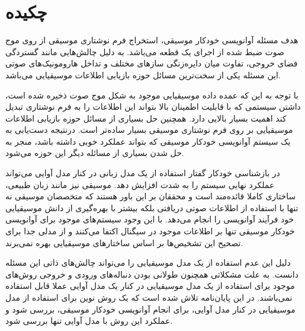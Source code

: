 \chapter*{چکیده}
هدف مسئله آوانویسی خودکار موسیقی، استخراج فرم نوشتاری موسیقی از روی موج صوت ضبط
شده از اجرای یک قطعه می‌باشد. به دلیل چالش‌هایی مانند گستردگی فضای خروجی، تفاوت
میان دایره‌زنگی سازهای مختلف و تداخل هارومونیک‌های صوتی این مسئله یکی از
سخت‌ترین مسائل حوزه بازیابی اطلاعات موسیقیایی می‌باشد.

با توجه به این که عمده داده موسیقیایی موجود به شکل موج صوت ذخیره شده است، داشتن
سیستمی که با قابلیت اطمینان بالا بتواند این اطلاعات را به فرم نوشتاری تبدیل کند
اهمیت بسیار بالایی دارد. همچنین حل بسیاری از مسائل حوزه بازیابی اطلاعات
موسیقیایی بر روی فرم نوشتاری موسیقی بسیار ساده‌تر است. درنتیجه دست‌یابی به یک
سیستم آوانویسی خودکار موسیقی که بتواند عملکرد خوبی داشته باشد، منجر به حل شدن
بسیاری از مسائله دیگر این حوزه می‌شود.

در بازشناسی خودکار گفتار استفاده از یک مدل زبانی در کنار مدل آوایی می‌تواند
عملکرد نهایی سیستم را به شدت افزایش دهد. موسیقی نیز مانند زبان طبیعی، ساختاری
کاملا قائده‌مند است و محققان بر این باور هستند که متخصصان موسیقی نه تنها با
استفاده از اطلاعات صوتی دریافتی بلکه بیشتر با بهره‌گیری از دانش موسیقیایی خود
فرآیند آوانویسی را انجام می‌دهد. با این وجود سیستم‌های موجود برای آوانویسی
خودکار موسیقی تنها بر اطلاعات موجود در سیگنال اکتفا می‌کنند و از مدلی جدا
برای تصحیح این تشخیص‌ها بر اساس ساختارهای موسیقیایی بهره نمی‌برند.

دلیل این عدم استفاده از یک مدل موسیقیایی را می‌تواند چالش‌های ذاتی این مسئله
دانست. به علت مشکلاتی همچنون طولانی بودن دنباله‌های ورودی و خروجی روش‌های موجود
برای استفاده از یک مدل موسیقیایی در کنار یک مدل آوایی عملا قابل استفاده
نمی‌باشند. در این پایان‌نامه تلاش شده است که یک روش نوین برای استفاده از مدل
موسیقیایی در کنار مدل آوایی، برای انجام آوانویسی خودکار موسیقی، بررسی شود و
عملکرد این روش با مدل آوایی تنها بررسی شود.